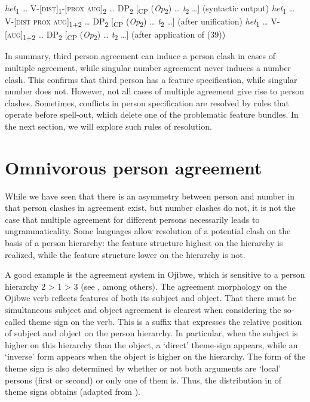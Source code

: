 \documentclass[output=paper]{langsci/langscibook}
\begin{document}
\ea \label{bkm:Ref295575416}  

\ea \textit{het}\textsubscript{1} … V-[\textsc{dist}]\textsubscript{1}{}-[\textsc{prox} \textsc{aug}]\textsubscript{2} … DP\textsubscript{2} [\textsubscript{CP} (\textit{Op}\textsubscript{2}) … \textit{t}\textsubscript{2} …]   (syntactic output)
\ex \textit{het}\textsubscript{1} … V-[\textsc{dist prox} \textsc{aug}]\textsubscript{1+2} … DP\textsubscript{2} [\textsubscript{CP} (\textit{Op}\textsubscript{2}) … \textit{t}\textsubscript{2} …]   (after unification)
\ex  \textit{het}\textsubscript{1} … V-[\textsc{aug}]\textsubscript{1+2} … DP\textsubscript{2} [\textsubscript{CP} (\textit{Op}\textsubscript{2}) … \textit{t}\textsubscript{2} …]     (after application of (39))
\z \z

In summary, third person agreement can induce a person clash in cases of multiple agreement, while singular number agreement never induces a number clash. This confirms that third person has a feature specification, while singular number does not. However, not all cases of multiple agreement give rise to person clashes. Sometimes, conflicts in person specification are resolved by rules that operate before spell-out, which delete one of the problematic feature bundles. In the next section, we will explore such rules of resolution.

\section{Omnivorous person agreement}%

While we have seen that there is an asymmetry between person and number in that person clashes in agreement exist, but number clashes do not, it is not the case that multiple agreement for different persons necessarily leads to ungrammaticality. Some languages allow resolution of a potential clash on the basis of a person hierarchy: the feature structure highest on the hierarchy is realized, while the feature structure lower on the hierarchy is not. 

  A good example is the agreement system in Ojibwe, which is sensitive to a person hierarchy 2 > 1 > 3 (see \citealt{Valentine2001}, among others). The agreement morphology on the Ojibwe verb reflects features of both its subject and object. That there must be simultaneous subject and object agreement is clearest when considering the so-called theme sign on the verb. This is a suffix that expresses the relative position of subject and object on the person hierarchy. In particular, when the subject is higher on this hierarchy than the object, a ‘direct’ theme-sign appears, while an ‘inverse’ form appears when the object is higher on the hierarchy. The form of the theme sign is also determined by whether or not both arguments are ‘local’ persons (first or second) or only one of them is. Thus, the distribution in  of theme signs obtains (adapted from \citealt{Lochbihler2008}).
\end{document}
